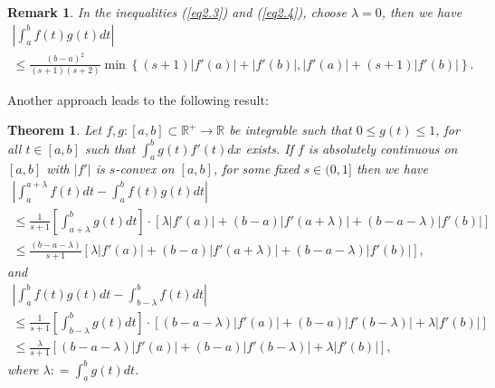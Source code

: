 \documentclass{amsart}
\newtheorem{theorem}{Theorem}
\theoremstyle{plain}
\newtheorem{remark}{Remark}
\numberwithin{equation}{section}
\begin{document}
\begin{remark}
In the inequalities (\ref{eq2.3}) and (\ref{eq2.4}), choose
$\lambda = 0$, then we have
\begin{multline}
\label{eq2.7}\left| {\int_a^b {f\left( t \right)g\left( t
\right)dt}  } \right|
\\
\le  \frac{\left( {b - a} \right)^{2}}{{\left( {s + 1}
\right)\left( {s + 2} \right)}}\min\left\{ {\left( {s + 1}
\right)\left| {f'\left( a \right)} \right|  + \left| {f'\left( b
\right)} \right| ,\left| {f'\left( a \right)} \right| + \left( {s
+ 1} \right)\left| {f'\left( b \right)} \right| } \right\}.
\end{multline}
\end{remark}

Another approach leads to the following result:
\begin{theorem}
\label{thm.main2}Let $f,g: [a,b]\subset \mathbb{R}^{+} \to
\mathbb{R}$ be integrable such that $0 \le g(t) \le 1$, for all $t
\in [a,b]$ such that $\int_a^b {g\left( t \right)f'\left( t
\right)dx}$ exists. If $f$ is absolutely continuous on $[a,b]$
with $|f'|$ is $s$-convex on $[a,b]$, for some fixed $s\in (0,1]$
then we have
\begin{multline}
\left| {\int_a^{a + \lambda } {f\left( t \right)dt}  - \int_a^b
{f\left( t \right)g\left( t \right)dt} } \right|
\\
\le \frac{1}{{s + 1}}\left[ {\int_{a + \lambda }^b {g\left( t
\right)dt}} \right] \cdot\left[ {\lambda \left| {f'\left( a
\right)} \right| + \left( {b - a} \right)\left| {f'\left( {a +
\lambda } \right)} \right| + \left( {b - a - \lambda }
\right)\left| {f'\left( b \right)} \right|} \right]\label{eq2.8}
\\
\le \frac{\left( {b - a - \lambda } \right)}{{s + 1}}\left[
{\lambda \left| {f'\left( a \right)} \right| + \left( {b - a}
\right)\left| {f'\left( {a + \lambda } \right)} \right| + \left(
{b - a - \lambda } \right)\left| {f'\left( b \right)} \right|}
\right],
\end{multline}
and
\begin{multline}
\left| {\int_a^b {f\left( t \right)g\left( t \right)dt}  - \int_{b
- \lambda }^b {f\left( t \right)dt} } \right|
\label{eq2.9}\\
\le \frac{1}{{s + 1}}\left[ {\int_{b - \lambda}^b {g\left( t
\right)dt}} \right] \cdot\left[ {\left( {b - a - \lambda }
\right)\left| {f'\left( a \right)} \right| + \left( {b - a}
\right)\left| {f'\left( {b - \lambda } \right)} \right| + \lambda
\left| {f'\left( b \right)} \right|} \right]
\\
\le \frac{\lambda}{{s + 1}} \left[ {\left( {b - a - \lambda }
\right)\left| {f'\left( a \right)} \right| + \left( {b - a}
\right)\left| {f'\left( {b - \lambda } \right)} \right| + \lambda
\left| {f'\left( b \right)} \right|} \right],
\end{multline}
where $\lambda : = \int_a^b {g\left( t \right)dt}$.
\end{theorem}
\end{document}
